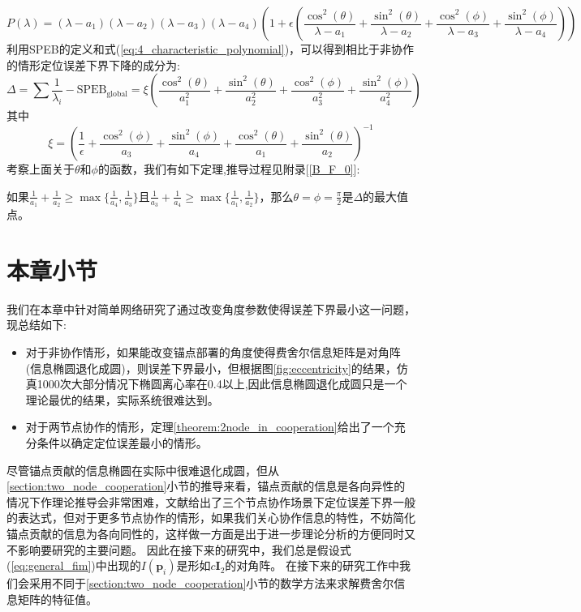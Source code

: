 \begin{equation}\label{eq:4_characteristic_polynomial}
P(\lambda)= (\lambda-a_1)(\lambda-a_2)(\lambda-a_3)(\lambda-a_4)(1+\epsilon(\frac{\cos^2(\theta)}{\lambda-a_1}+
 \frac{\sin^2(\theta)}{\lambda-a_2}+\frac{\cos^2(\phi)}{\lambda-a_3}+\frac{\sin^2(\phi)}{\lambda-a_4}))
\end{equation}
利用SPEB的定义和式(\ref{eq:4_characteristic_polynomial})，可以得到相比于非协作的情形定位误差下界下降的成分为:
\begin{equation}
\Delta=\sum \frac{1}{\lambda_i}-\text{SPEB}_{\text{global}}=\xi\left(\frac{\cos^2(\theta)}{a_1^2}+\frac{\sin^2(\theta)}{a_2^2}+\frac{\cos^2(\phi)}{a_3^2}+\frac{\sin^2(\phi)}{a_4^2}\right)
\end{equation}
其中
\begin{equation}
\xi=\left(\frac{1}{\epsilon}+\frac{\cos^2(\phi)}{a_3}+\frac{\sin^2(\phi)}{a_4}+\frac{\cos^2(\theta)}{a_1}+\frac{\sin^2(\theta)}{a_2}\right)^{-1}
\end{equation}
考察上面关于$\theta$和$\phi$的函数，我们有如下定理,推导过程见附录[\ref{B_F_0}]:
\begin{theorem}\label{theorem:2node_in_cooperation}
如果$\frac{1}{a_1}+\frac{1}{a_2}\geq \max\{\frac{1}{a_4},\frac{1}{a_3}\}$且$\frac{1}{a_3}+\frac{1}{a_4}\geq\max\{\frac{1}{a_1},\frac{1}{a_2}\}$，那么$\theta=\phi=\frac{\pi}{2}$是$\Delta$的最大值点。
\end{theorem}
\section{本章小节}\label{section:conclusion3}
  我们在本章中针对简单网络研究了通过改变角度参数使得误差下界最小这一问题，现总结如下:
  \begin{itemize}
  \item 对于非协作情形，如果能改变锚点部署的角度使得费舍尔信息矩阵是对角阵(信息椭圆退化成圆)，则误差下界最小，但根据图\ref{fig:eccentricity}的结果，仿真1000次大部分情况下椭圆离心率在0.4以上,因此信息椭圆退化成圆只是一个理论最优的结果，实际系统很难达到。
  \item 对于两节点协作的情形，定理\ref{theorem:2node_in_cooperation}给出了一个充分条件以确定定位误差最小的情形。
  \end{itemize}


  尽管锚点贡献的信息椭圆在实际中很难退化成圆，但从\ref{section:two_node_cooperation}小节的推导来看，锚点贡献的信息是各向异性的情况下作理论推导会非常困难，文献\cite{LimitBound3}给出了三个节点协作场景下定位误差下界一般的表达式，但对于更多节点协作的情形，如果我们关心协作信息的特性，不妨简化锚点贡献的信息为各向同性的，这样做一方面是出于进一步理论分析的方便同时又不影响要研究的主要问题。
  因此在接下来的研究中，我们总是假设式(\ref{eq:general_fim})中出现的$I(\bm{p}_i)$是形如$c\bm{I}_2$的对角阵。
  在接下来的研究工作中我们会采用不同于\ref{section:two_node_cooperation}小节的数学方法来求解费舍尔信息矩阵的特征值。

